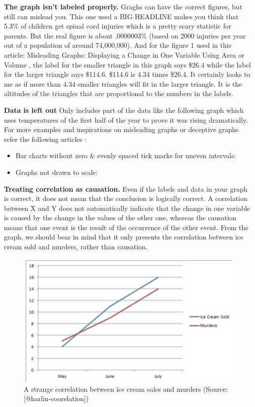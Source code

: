 \documentclass[]{book}
\providecommand{\tightlist}{%
  \setlength{\itemsep}{0pt}\setlength{\parskip}{0pt}}
\theoremstyle{definition}
\theoremstyle{definition}
\theoremstyle{definition}
\theoremstyle{remark}
\begin{document}
\textbf{The graph isn't labeled properly.} Graghs can have the correct
figures, but still can mislead you. This one used a BIG HEADLINE makes
you think that 5.3\% of children get spinal cord injuries which is a
pretty scary statistic for parents. But the real figure is about
.0000003\% (based on 2000 injuries per year out of a population of
around 74,000,000). And for the figure 1 used in this article:
Misleading Graphs: Displaying a Change in One Variable Using Area or
Volume \citep{scaling_issues}, the label for the smaller triangle in
this graph says \$26.4 while the label for the larger triangle says
\$114.6. \$114.6 is 4.34 times \$26.4. It certainly looks to me as if
more than 4.34 smaller triangles will fit in the larger triangle. It is
the altitudes of the triangles that are proportional to the numbers in
the labels.

\textbf{Data is left out} Only includes part of the data like the
following graph which uses temperatures of the first half of the year to
prove it was rising dramatically. For more examples and inspirations on
misleading graphs or deceptive graphs refer the following articles :

\begin{itemize}
\tightlist
\item
  Bar charts without zero \& evenly spaced tick marks for uneven
  intervals: \citep{whats_wrong}
\item
  Graphs not drawn to scale:\citep{scaling_issues}
\end{itemize}

\textbf{Treating correlation as causation.} Even if the labels and data
in your graph is correct, it does not mean that the conclusion is
logically correct. A correlation between X and Y does not automatically
indicate that the change in one variable is caused by the change in the
values of the other one, whereas the causation means that one event is
the result of the occurrence of the other event. From the graph, we
should bear in mind that it only presents the correlation between ice
cream sold and murders, rather than causation.

\begin{figure}
\includegraphics[width=0.7\linewidth]{images/harlin-ice-cream} \caption{A strange correlation between ice cream sales and murders (Source: [@harlin-coorelation])}\label{fig:harlin-ice-cream}
\end{figure}
\end{document}
